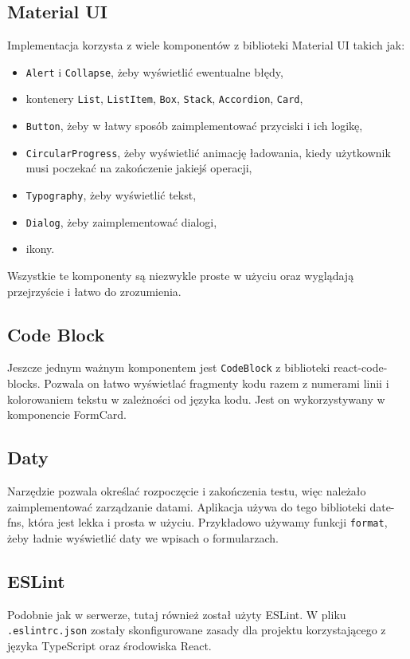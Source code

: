 \subsection{Material UI}
Implementacja korzysta z wiele komponentów z biblioteki Material UI takich jak:
\begin{itemize}
  \item \texttt{Alert} i \texttt{Collapse}, żeby wyświetlić ewentualne błędy,
  \item kontenery \texttt{List}, \texttt{ListItem}, \texttt{Box}, \texttt{Stack},
    \texttt{Accordion}, \texttt{Card},
  \item \texttt{Button}, żeby w łatwy sposób zaimplementować przyciski
    i ich logikę,
  \item \texttt{CircularProgress}, żeby wyświetlić animację ładowania, kiedy
    użytkownik musi poczekać na zakończenie jakiejś operacji,
  \item \texttt{Typography}, żeby wyświetlić tekst,
  \item \texttt{Dialog}, żeby zaimplementować dialogi,
  \item ikony.
\end{itemize}
Wszystkie te komponenty są niezwykle proste w użyciu oraz wyglądają przejrzyście
i łatwo do zrozumienia.
\subsection{Code Block}
Jeszcze jednym ważnym komponentem jest \texttt{CodeBlock} z biblioteki react-code-blocks.
Pozwala on łatwo wyświetlać fragmenty kodu razem z numerami linii i kolorowaniem
tekstu w zależności od języka kodu. Jest on wykorzystywany w komponencie FormCard.
\subsection{Daty}
Narzędzie pozwala określać rozpoczęcie i zakończenia testu, więc należało
zaimplementować zarządzanie datami. Aplikacja używa do tego biblioteki date-fns,
która jest lekka i prosta w użyciu. Przykładowo używamy funkcji \texttt{format}, żeby
ładnie wyświetlić daty we wpisach o formularzach.

\subsection{ESLint}
Podobnie jak w serwerze, tutaj również został użyty ESLint. W pliku\\
\texttt{.eslintrc.json} zostały skonfigurowane zasady dla projektu korzystającego
z języka TypeScript oraz środowiska React.

